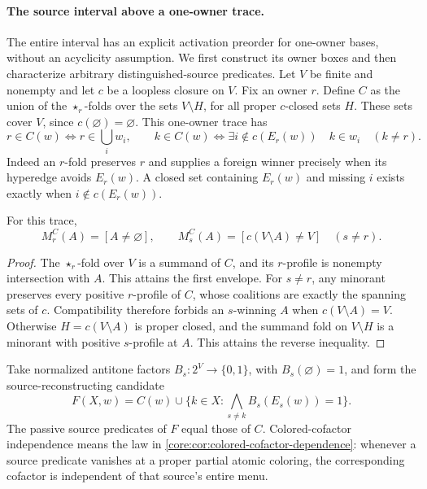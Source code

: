 \paragraph{The source interval above a one-owner trace.}
The entire interval has an explicit activation preorder for one-owner
bases, without an acyclicity assumption. We first construct its owner
boxes and then characterize arbitrary distinguished-source predicates.
Let $V$ be finite and nonempty and
let $c$ be a loopless closure on $V$. Fix an owner $r$. Define $C$ as
the union of the $\star_r$-folds over the sets $V\setminus H$, for
all proper $c$-closed sets $H$. These sets cover $V$, since
$c(\varnothing)=\varnothing$. This one-owner trace has
\begin{equation}\label{core:eq:one-owner-trace-value}
 r\in C(w)\iff r\in\bigcup_iw_i,\qquad
 k\in C(w)\iff
 \exists i\notin c(E_r(w))\quad k\in w_i\quad(k\ne r).
\end{equation}
Indeed an $r$-fold preserves $r$ and supplies a foreign winner precisely
when its hyperedge avoids $E_r(w)$. A closed set containing $E_r(w)$
and missing $i$ exists exactly when $i\notin c(E_r(w))$.

\begin{corollary}
\label{core:cor:one-owner-minorant-profiles}
For this trace,
\[
 M_r^C(A)=[A\ne\varnothing],\qquad
 M_s^C(A)=[c(V\setminus A)\ne V]\quad(s\ne r).
\]
\end{corollary}
\begin{proof}
The $\star_r$-fold over $V$ is a summand of $C$, and its $r$-profile
is nonempty intersection with $A$. This attains the first envelope.
For $s\ne r$, any minorant preserves every positive $r$-profile of
$C$, whose coalitions are exactly the spanning sets of $c$.
Compatibility therefore forbids an $s$-winning $A$ when
$c(V\setminus A)=V$.
Otherwise $H=c(V\setminus A)$ is proper closed, and the summand
fold on $V\setminus H$ is a minorant with positive $s$-profile at $A$.
This attains the reverse inequality.
\end{proof}

Take normalized antitone factors $B_s:2^V\to\{0,1\}$, with
$B_s(\varnothing)=1$, and form the source-reconstructing candidate
\[
 F(X,w)=C(w)\cup
 \{k\in X:\bigwedge_{s\ne k}B_s(E_s(w))=1\}.
\]
The passive source predicates of $F$ equal those of $C$.
Colored-cofactor independence means the law in
\cref{core:cor:colored-cofactor-dependence}: whenever a source predicate
vanishes at a proper partial atomic coloring, the corresponding
cofactor is independent of that source's entire menu.

